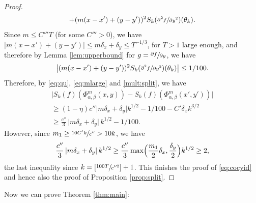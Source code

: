 \documentclass[10pt]{amsart}
\theoremstyle{definition}
\theoremstyle{plain}
\begin{document}
\begin{proof}
\begin{multline*}
+(m(x-x')+(y-y'))^2
S_k(\sfrac{\partial^2 f}{\partial y^2})(\theta_k).
\end{multline*}
Since $m\leq C''' T$ (for some $C'''>0$), we have $\vert m(x-x')+(y-y')\vert \leq m\delta_x + \delta_y \leq T^{-1/3}$, for $T>1$ large enough, and therefore by Lemma \ref{lem:upperbound} for $g=\sfrac{\partial f}{\partial y}$, we have
\[
\bigl|(m(x-x')+(y-y'))^2
S_k(\sfrac{\partial^2 f}{\partial y^2})(\theta_k)\bigr|\leq 1/100.
\]
Therefore, by \eqref{eq:qu}, \eqref{eq:mlarge} and \eqref{mult:split}, we have\vspace*{-5pt}
\begin{multline*}
\bigl|S_{k}(f)(\Phi_{\alpha,\beta}^m(x,y))-S_{k}(f)(\Phi_{\alpha,\beta}^m(x',y'))\bigr| \\
\geq (1-\eta)c''\vert m\delta_x+\delta_y\vert k^{1/2}-1/100-C'\delta_x k^{3/2}\\
\geq
\frac{c''}{3}\,\vert m\delta_x+\delta_y\vert\, k^{1/2}-1/100.
\end{multline*}
However, since $m_1\geq \sfrac{10C'k}{c''} >10k$, we have
\[
\frac{c''}{3}\,\vert m\delta_x+\delta_y\vert\, k^{1/2}\geq \frac{c''}{3}\max\Bigl(\frac{m_1}{2}\delta_x,\frac{\delta_y}{2}\Bigr)k^{1/2} \geq 2,
\]
the last inequality since $k=[\sfrac{100T}{c''^2}]+1$. This finishes the proof of \eqref{eq:cocyid} and hence also the proof of Proposition \ref{prop:split}.
\end{proof}

Now we can prove Theorem \ref{thm:main}:
\end{document}
